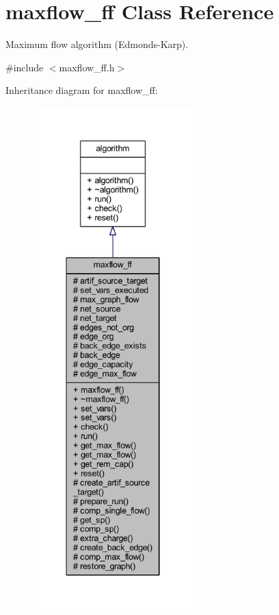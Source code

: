 \hypertarget{classmaxflow__ff}{}\section{maxflow\+\_\+ff Class Reference}
\label{classmaxflow__ff}


Maximum flow algorithm (Edmonds-\/\+Karp).  




{\ttfamily \#include $<$maxflow\+\_\+ff.\+h$>$}



Inheritance diagram for maxflow\+\_\+ff\+:\nopagebreak
\begin{figure}[H]
\begin{center}
\leavevmode
\includegraphics[height=550pt]{classmaxflow__ff__inherit__graph}
\end{center}
\end{figure}


